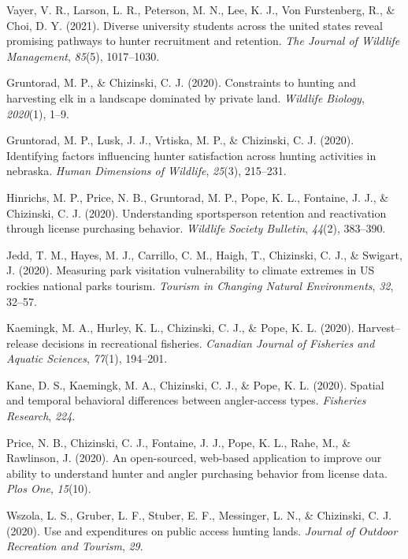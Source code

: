 \documentclass[
  12pt,
]
{article}
\newlength{\cslhangindent}
\newlength{\cslentryspacingunit} %
\newenvironment{CSLReferences}[2] %
 {%
  \setlength{\parindent}{0pt}
  \ifodd #1
  \let\oldpar\par
  \def\par{\hangindent=\cslhangindent\oldpar}
  \fi
  \setlength{\parskip}{#2\cslentryspacingunit}
 }%
 {}
\begin{document}
\begin{CSLReferences}{1}{0}
\leavevmode{}%
Vayer, V. R., Larson, L. R., Peterson, M. N., Lee, K. J., Von
Furstenberg, R., \& Choi, D. Y. (2021). Diverse university students
across the united states reveal promising pathways to hunter recruitment
and retention. \emph{The Journal of Wildlife Management}, \emph{85}(5),
1017--1030.

\leavevmode{}%
Gruntorad, M. P., \& Chizinski, C. J. (2020). Constraints to hunting and
harvesting elk in a landscape dominated by private land. \emph{Wildlife
Biology}, \emph{2020}(1), 1--9.

\leavevmode{}%
Gruntorad, M. P., Lusk, J. J., Vrtiska, M. P., \& Chizinski, C. J.
(2020). Identifying factors influencing hunter satisfaction across
hunting activities in nebraska. \emph{Human Dimensions of Wildlife},
\emph{25}(3), 215--231.

\leavevmode{}%
Hinrichs, M. P., Price, N. B., Gruntorad, M. P., Pope, K. L., Fontaine,
J. J., \& Chizinski, C. J. (2020). Understanding sportsperson retention
and reactivation through license purchasing behavior. \emph{Wildlife
Society Bulletin}, \emph{44}(2), 383--390.

\leavevmode{}%
Jedd, T. M., Hayes, M. J., Carrillo, C. M., Haigh, T., Chizinski, C. J.,
\& Swigart, J. (2020). Measuring park visitation vulnerability to
climate extremes in US rockies national parks tourism. \emph{Tourism in
Changing Natural Environments}, \emph{32}, 32--57.

\leavevmode{}%
Kaemingk, M. A., Hurley, K. L., Chizinski, C. J., \& Pope, K. L. (2020).
Harvest--release decisions in recreational fisheries. \emph{Canadian
Journal of Fisheries and Aquatic Sciences}, \emph{77}(1), 194--201.

\leavevmode{}%
Kane, D. S., Kaemingk, M. A., Chizinski, C. J., \& Pope, K. L. (2020).
Spatial and temporal behavioral differences between angler-access types.
\emph{Fisheries Research}, \emph{224}.

\leavevmode{}%
Price, N. B., Chizinski, C. J., Fontaine, J. J., Pope, K. L., Rahe, M.,
\& Rawlinson, J. (2020). An open-sourced, web-based application to
improve our ability to understand hunter and angler purchasing behavior
from license data. \emph{Plos One}, \emph{15}(10).

\leavevmode{}%
Wszola, L. S., Gruber, L. F., Stuber, E. F., Messinger, L. N., \&
Chizinski, C. J. (2020). Use and expenditures on public access hunting
lands. \emph{Journal of Outdoor Recreation and Tourism}, \emph{29}.


\end{CSLReferences}
\end{document}
